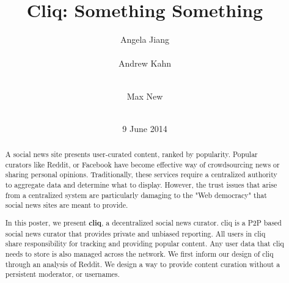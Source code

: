 \documentclass{sig-alternate}
\begin{document}
\nocite{*}


\title{Cliq: Something Something}


\author{
\alignauthor Angela Jiang\\
  \\
\alignauthor Andrew Kahn\\
  \\
\and
\alignauthor Max New\\
  \\
}

\date{9 June 2014}

\maketitle
\begin{abstract}
A social news site presents user-curated content, ranked by popularity. Popular 
curators like Reddit, or Facebook have become effective way of crowdsourcing 
news or sharing personal opinions. Traditionally, these services require a 
centralized authority to aggregate data and determine what to display. However, 
the trust issues that arise from a centralized system are particularly damaging to 
the "Web democracy" that social news sites are meant to provide. 

In this poster, we present {\bf cliq}, a decentralized social news curator. cliq is a P2P based 
social news curator that provides private and unbiased reporting. All users in cliq share 
responsibility for tracking and providing popular content. Any user data that cliq needs 
to store is also managed across the network. We first inform our design of cliq through 
an analysis of Reddit. We design a way to provide content curation without a persistent 
moderator, or usernames.
\end{abstract}
\end{document}
